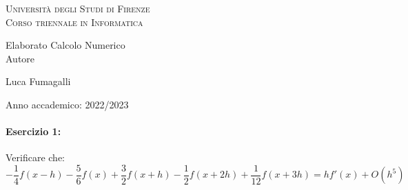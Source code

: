 \documentclass[12pt]{article}
\begin{document}
\begin{titlepage}
\centering

\vspace*{20mm}
\textsc{\LARGE Università degli Studi di Firenze}\\[0.5cm]
\textsc{\Large Corso triennale in Informatica}\\[0.5cm]

\vspace{20mm}

\huge Elaborato Calcolo Numerico\\[0.5cm]

\vspace{20mm}
\small Autore

\Large Luca Fumagalli\\[0.5cm]

\vspace{10mm}

\large Anno accademico: 2022/2023\\[0.5cm]

\end{titlepage}

\paragraph{Esercizio 1:}
Verificare che:
$$ -\frac{1}{4}f(x-h)-\frac{5}{6}f(x)+\frac{3}{2}f(x+h)-\frac{1}{2}f(x+2h)+\frac{1}{12}f(x+3h)=hf'(x) + O(h^5)$$
\end{document}
